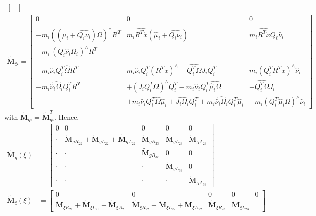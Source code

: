 \documentclass[10pt]{article}
\begin{document}
\begin{itemize}
\begin{align*}
\begin{bmatrix}
	\end{bmatrix}
	\\
	\tilde{\mathbf{M}}_{\xi i} = \begin{bmatrix}
	0 & 0 & 0 \\\\
	-m_i((\hat\mu_i + \widehat{Q_i\nu_i}) \Omega)^\wedge R^T &  m_i \widehat{R^T \dot{x}} (\hat{\mu}_i + \widehat{Q_i\nu_i})
	& m_i\widehat{R^T \dot{x}}Q_i\hat\nu_i\\
	-m_i \ (Q_i \hat{\nu}_i \Omega_i)^\wedge R^T  & &
	\\\\
	-m_i \hat{\nu}_iQ_i^T\hat{\Omega}R^T &  m_i \hat{\nu}_i Q_i^T (R^T \dot{x})^\wedge - \widehat{Q_i^T\Omega}J_iQ_i^T &  m_i (Q_i^T R^T \dot{x})^\wedge \hat\nu_i \\
	-m_i \widehat{\hat\nu_i\Omega_i} Q_i^T R^T & + (J_iQ_i^T\Omega)^\wedge Q_i^T -m_i\hat\nu_i Q_i^T \widehat{\hat\mu_i \Omega} & -\widehat{Q_i^T \Omega} J_i \\
	& +m_i\hat{\nu}_i Q_i^T \hat{\Omega} \hat\mu_i + \widehat{J_i\Omega_i}Q_i^T + m_i\widehat{\hat\nu_i \Omega_i} Q_i^T\hat\mu_i & - m_i(Q_i^T \hat\mu_i \Omega)^\wedge\hat\nu_i
	\end{bmatrix}
	\end{align*}
	with $ \tilde{\mathbf{M}}_{gi} = \tilde{\mathbf{M}}_{gi}^T $. Hence,
	\begin{align*}
	{\tilde{\mathbf{M}}_g}(\xi) &= \begin{bmatrix}
	0 & 0 & 0 & 0 & 0\\
	\cdot & \tilde{\mathbf{M}}_{gR_{22}} + \tilde{\mathbf{M}}_{gL_{22}} + \tilde{\mathbf{M}}_{gA_{22}} & \tilde{\mathbf{M}}_{gR_{23}} & \tilde{\mathbf{M}}_{gL_{23}} & \tilde{\mathbf{M}}_{gA_{23}} \\
	\cdot & \cdot & \tilde{\mathbf{M}}_{gR_{33}} & 0 & 0 \\
	\cdot & \cdot & \cdot & \tilde{\mathbf{M}}_{gL_{33}} & 0 \\
	\cdot & \cdot & \cdot & \cdot & \tilde{\mathbf{M}}_{gA_{33}}
	\end{bmatrix}
	\\
	{\tilde{\mathbf{M}}_\xi}(\xi) &= \begin{bmatrix}
	0 & 0 & 0 & 0 & 0 \\
	\tilde{\mathbf{M}}_{\xi R_{21}} + \tilde{\mathbf{M}}_{\xi L_{21}} + \tilde{\mathbf{M}}_{\xi A_{21}} & \tilde{\mathbf{M}}_{\xi R_{22}} + \tilde{\mathbf{M}}_{\xi L_{22}} + \tilde{\mathbf{M}}_{\xi A_{22}}
	& \tilde{\mathbf{M}}_{\xi R_{23}} 
	& \tilde{\mathbf{M}}_{\xi L_{23}} 

\end{bmatrix}
\end{align*}
\end{itemize}
\end{document}
